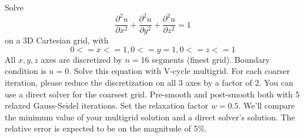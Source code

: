 \documentclass[a4paper,onecolumn]{article}
\begin{document}
\setcounter{page}{1}


Solve 
$$
\frac{\partial^2 u}{\partial x^2} + \frac{\partial^2 u}{\partial y^2} 
 + \frac{\partial^2 u}{\partial z^2} =1
$$
on a 3D Cartesian grid, with
$$
0 <= x <= 1, 0 <= y = 1, 0 <= z <=1
$$
All $x,y,z$ axes are discretized by $n=16$ segments (finest grid). Boundary condition is
$u=0$. Solve this equation with V-cycle multigrid. For each coarser iteration, please
reduce the discretization on all 3 axes by a factor of 2. You can use a direct solver
for the coarsest grid.
Pre-smooth and post-smooth
both with 5 relaxed Gauss-Seidel iterations. Set the relaxation factor $w=0.5$.
We'll compare the minimum value of your multigrid solution and a direct solver's solution.
The relative error is expected to be on the magnitude of 5\%.
\end{document}
